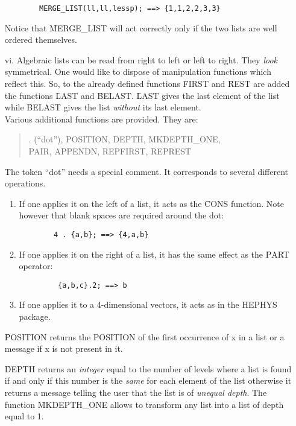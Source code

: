 \begin{itemize}
\begin{verbatim}
        MERGE_LIST(ll,ll,lessp); ==> {1,1,2,2,3,3}
\end{verbatim}
Notice that \f{MERGE\_LIST} will act correctly only if the two lists 
are well ordered themselves. 
\item[vi.]
Algebraic lists can be read from right to left or left to right.
They {\em look} symmetrical. One would like to dispose of manipulation
functions which reflect this.
So, to the already defined functions  \f{FIRST} and \f{REST} are
added the functions \f{LAST}  and \f{BELAST}. \f{LAST} gives the last
element of the list while \f{BELAST} gives the list {\em without} its
last element. \\
Various additional functions are provided. They are:
\begin{quote}
\f{ . (``dot''), POSITION, DEPTH, MKDEPTH\_ONE, \\
PAIR, APPENDN, REPFIRST, REPREST}
\end{quote}
The token ``dot'' needs a special comment. It corresponds to
several different operations.
\begin{enumerate}
\item If one applies it on the left of a list, it acts as the \f{CONS}
function. Note however that blank spaces are required around the dot:
\begin{verbatim}
        4 . {a,b}; ==> {4,a,b}
\end{verbatim}
\item If one applies it on the right of a list, it has the same
effect as the \f{PART} operator:
\begin{verbatim}
         {a,b,c}.2; ==> b
\end{verbatim}
\item If one applies it to  a 4-dimensional vectors, it acts as in the
HEPHYS package.
\end{enumerate}
\f{POSITION} returns the POSITION of the first occurrence of x in
a list or a message if x is not present in it.

\f{DEPTH} returns an {\em integer} equal to the number of levels where a
list is found if and only if this number is the {\em same} for each
element of the list  otherwise it returns a message telling the user
that the list is of {\em unequal depth}. The function \f{MKDEPTH\_ONE}
allows to transform any list into a list of depth equal to 1.


\end{itemize}
